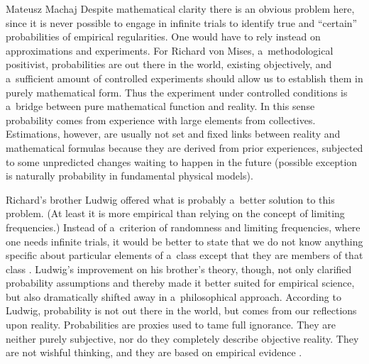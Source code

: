 \begin{artengenv}{Mateusz Machaj}
Despite mathematical clarity there is an obvious problem here, since it is never possible to engage in infinite trials to identify true and ``certain'' probabilities of empirical regularities. One would have to rely instead on approximations and experiments. For Richard von Mises, a~methodological positivist, probabilities are out there in the world, existing objectively, and a~sufficient amount of controlled experiments should allow us to establish them in purely mathematical form. Thus the experiment under controlled conditions is a~bridge between pure mathematical function and reality. In this sense probability comes from experience with large elements from collectives. Estimations, however, are usually not set and fixed links between reality and mathematical formulas because they are derived from prior experiences, subjected to some unpredicted changes waiting to happen in the future (possible exception is naturally probability in fundamental physical models).



Richard's brother Ludwig offered what is probably a~better solution to this problem. (At least it is more empirical than relying on the concept of limiting frequencies.) Instead of a~criterion of randomness and limiting frequencies, where one needs infinite trials, it would be better to state that we do not know anything specific about particular elements of a~class except that they are members of that class 
\parencite[][p.109]{mises_human_1966}. %
 Ludwig's improvement on his brother's theory, though, not only clarified probability assumptions and thereby made it better suited for empirical science, but also dramatically shifted away in a~philosophical approach. According to Ludwig, probability is not out there in the world, but comes from our reflections upon reality. Probabilities are proxies used to tame full ignorance. They are neither purely subjective, nor do they completely describe objective reality. They are not wishful thinking, and they are based on empirical evidence 
\parencite[][p.233]{moser_foundations_1988}.%





\end{artengenv}
